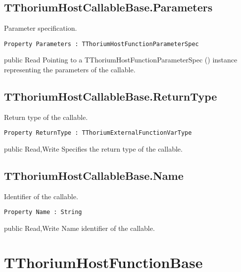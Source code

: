 \subsection{TThoriumHostCallableBase.Parameters}
\label{thoriumcorepkg:thorium:tthoriumhostcallablebase:parameters}
\begin{FPCList}
\Synopsis
Parameter specification.\Declaration 

\begin{verbatim}
Property Parameters : TThoriumHostFunctionParameterSpec
\end{verbatim}
\Visibility
public
\Access
Read
\Description
Pointing to a TThoriumHostFunctionParameterSpec (\pageref{thoriumcorepkg:thorium:tthoriumhostfunctionparameterspec}) instance representing the parameters of the callable.\end{FPCList}
\subsection{TThoriumHostCallableBase.ReturnType}
\label{thoriumcorepkg:thorium:tthoriumhostcallablebase:returntype}
\begin{FPCList}
\Synopsis
Return type of the callable.\Declaration 

\begin{verbatim}
Property ReturnType : TThoriumExternalFunctionVarType
\end{verbatim}
\Visibility
public
\Access
Read,Write
\Description
Specifies the return type of the callable.\end{FPCList}
\subsection{TThoriumHostCallableBase.Name}
\label{thoriumcorepkg:thorium:tthoriumhostcallablebase:name}
\begin{FPCList}
\Synopsis
Identifier of the callable.\Declaration 

\begin{verbatim}
Property Name : String
\end{verbatim}
\Visibility
public
\Access
Read,Write
\Description
Name identifier of the callable.\end{FPCList}
\section{TThoriumHostFunctionBase}
\label{thoriumcorepkg:thorium:tthoriumhostfunctionbase}
